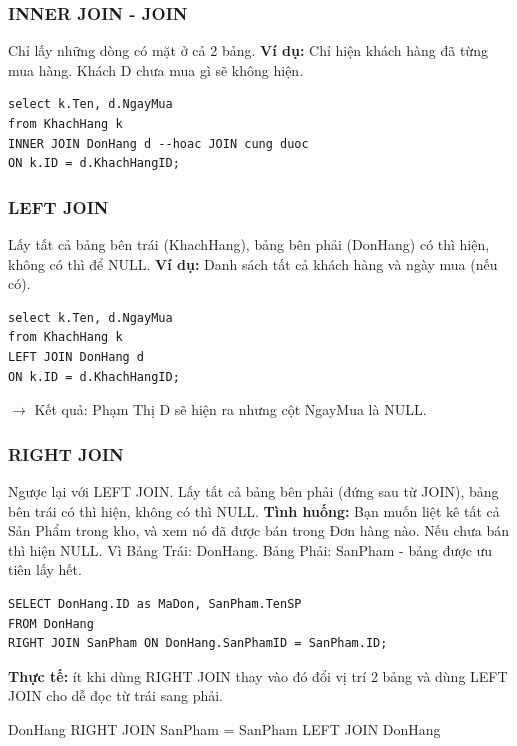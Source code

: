 \documentclass[12pt,a4paper]{article}
\begin{document}
\subsubsection{INNER JOIN - JOIN}
Chỉ lấy những dòng có mặt ở cả 2 bảng.\newline
\textbf{Ví dụ:} Chỉ hiện khách hàng đã từng mua hàng. Khách D chưa mua gì sẽ không hiện.
\begin{lstlisting}[style=sqlstyle]
select k.Ten, d.NgayMua
from KhachHang k
INNER JOIN DonHang d --hoac JOIN cung duoc
ON k.ID = d.KhachHangID;
\end{lstlisting}
\subsubsection{LEFT JOIN}
Lấy tất cả bảng bên trái (KhachHang), bảng bên phải (DonHang) có thì hiện, không có thì để NULL.\newline
\textbf{Ví dụ:} Danh sách tất cả khách hàng và ngày mua (nếu có).
\begin{lstlisting}[style=sqlstyle]
select k.Ten, d.NgayMua
from KhachHang k
LEFT JOIN DonHang d
ON k.ID = d.KhachHangID;
\end{lstlisting}
$\rightarrow$ Kết quả: Phạm Thị D sẽ hiện ra nhưng cột NgayMua là NULL.
\subsubsection{RIGHT JOIN}
Ngược lại với LEFT JOIN. Lấy tất cả bảng bên phải (đứng sau từ JOIN), bảng bên trái có thì hiện, không có thì NULL.
\textbf{Tình huống:} Bạn muốn liệt kê tất cả Sản Phẩm trong kho, và xem nó đã được bán trong Đơn hàng nào. Nếu chưa bán thì hiện NULL.\newline
Vì Bảng Trái: DonHang.
Bảng Phải: SanPham - bảng được ưu tiên lấy hết.
\begin{lstlisting}[style=sqlstyle]
SELECT DonHang.ID as MaDon, SanPham.TenSP
FROM DonHang 
RIGHT JOIN SanPham ON DonHang.SanPhamID = SanPham.ID;
\end{lstlisting}
\textbf{Thực tế: } ít khi dùng RIGHT JOIN thay vào đó đổi vị trí 2 bảng và dùng LEFT JOIN cho dễ đọc từ trái sang phải.
\begin{center}
    DonHang RIGHT JOIN SanPham = SanPham LEFT JOIN DonHang
\end{center}
\end{document}
